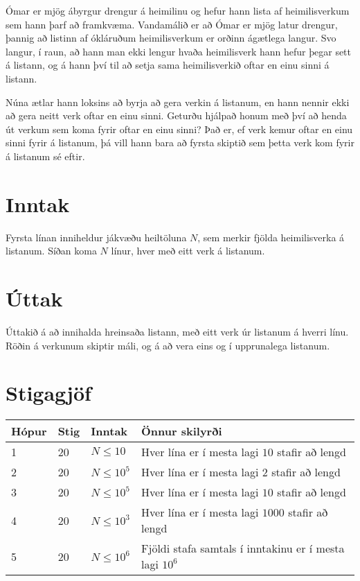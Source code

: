 

Ómar er mjög ábyrgur drengur á heimilinu og hefur hann lista af heimilisverkum
sem hann þarf að framkvæma. Vandamálið er að Ómar er mjög latur drengur, þannig
að listinn af ókláruðum heimilisverkum er orðinn ágætlega langur. Svo langur, í raun,
að hann man ekki lengur hvaða heimilisverk hann hefur þegar sett á listann, og á
hann því til að setja sama heimilisverkið oftar en einu sinni á listann.

Núna ætlar hann loksins að byrja að gera verkin á listanum, en hann nennir ekki
að gera neitt verk oftar en einu sinni. Geturðu hjálpað honum með því að henda
út verkum sem koma fyrir oftar en einu sinni? Það er, ef verk kemur oftar en einu
sinni fyrir á listanum, þá vill hann bara að fyrsta skiptið sem þetta verk kom
fyrir á listanum sé eftir.

\section*{Inntak}
Fyrsta línan inniheldur jákvæðu heiltöluna $N$, sem merkir fjölda heimilisverka
á listanum. Síðan koma $N$ línur, hver með eitt verk á listanum.

\section*{Úttak}
Úttakið á að innihalda hreinsaða listann, með eitt verk úr listanum á hverri línu.
Röðin á verkunum skiptir máli, og á að vera eins og í upprunalega listanum.

\section*{Stigagjöf}
\begin{tabular}{|l|l|l|l|}
\hline
Hópur & Stig & Inntak & Önnur skilyrði \\ \hline
1     & 20 & $N \leq 10$   & Hver lína er í mesta lagi $10$ stafir að lengd   \\ \hline
2     & 20 & $N \leq 10^5$ & Hver lína er í mesta lagi $2$ stafir að lengd \\ \hline
3     & 20 & $N \leq 10^5$ & Hver lína er í mesta lagi $10$ stafir að lengd  \\ \hline
4     & 20 & $N \leq 10^3$ & Hver lína er í mesta lagi $1000$ stafir að lengd  \\ \hline
5     & 20 & $N \leq 10^6$ & Fjöldi stafa samtals í inntakinu er í mesta lagi $10^6$ \\ \hline
\end{tabular}


